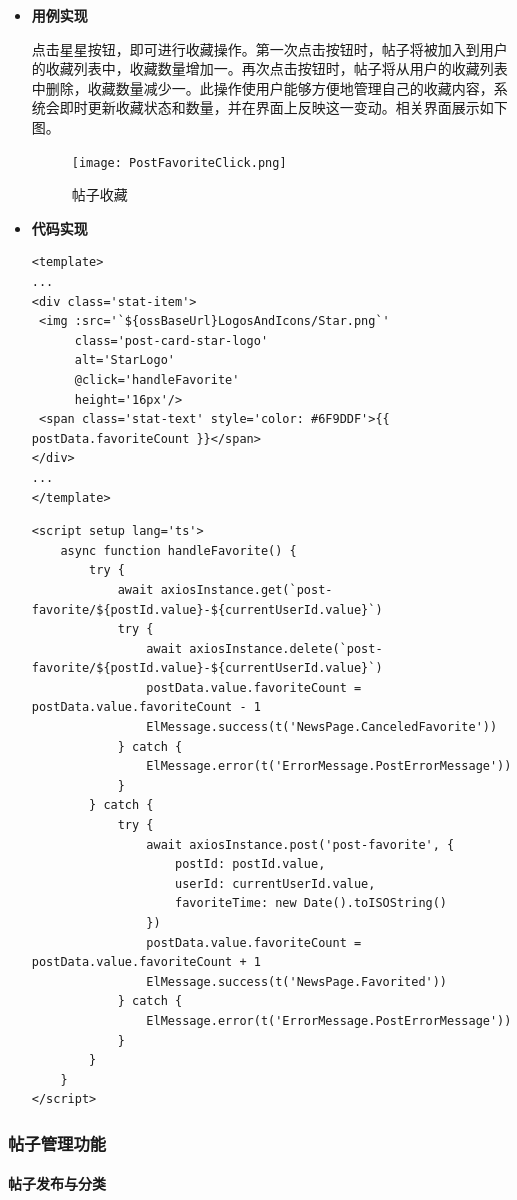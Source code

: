 \begin{itemize}
	\item \textbf{用例实现}
	
	点击星星按钮，即可进行收藏操作。第一次点击按钮时，帖子将被加入到用户的收藏列表中，收藏数量增加一。再次点击按钮时，帖子将从用户的收藏列表中删除，收藏数量减少一。此操作使用户能够方便地管理自己的收藏内容，系统会即时更新收藏状态和数量，并在界面上反映这一变动。相关界面展示如下图。
	
	\begin{figure}[H]
		\centering
		\texttt{[image: PostFavoriteClick.png]} 
		\caption{帖子收藏}
		\label{fig:post-favorite-click}
	\end{figure}
	
	\item \textbf{代码实现}
	\begin{verbatim}
<template>
...
<div class='stat-item'>
 <img :src='`${ossBaseUrl}LogosAndIcons/Star.png`'
      class='post-card-star-logo'
      alt='StarLogo'
      @click='handleFavorite'
      height='16px'/>
 <span class='stat-text' style='color: #6F9DDF'>{{ postData.favoriteCount }}</span>
</div>
...
</template>
	\end{verbatim}
	
	\begin{verbatim}
<script setup lang='ts'>
	async function handleFavorite() {
		try {
			await axiosInstance.get(`post-favorite/${postId.value}-${currentUserId.value}`)
			try {
				await axiosInstance.delete(`post-favorite/${postId.value}-${currentUserId.value}`)
				postData.value.favoriteCount = postData.value.favoriteCount - 1
				ElMessage.success(t('NewsPage.CanceledFavorite'))
			} catch {
				ElMessage.error(t('ErrorMessage.PostErrorMessage'))
			}
		} catch {
			try {
				await axiosInstance.post('post-favorite', {
					postId: postId.value,
					userId: currentUserId.value,
					favoriteTime: new Date().toISOString()
				})
				postData.value.favoriteCount = postData.value.favoriteCount + 1
				ElMessage.success(t('NewsPage.Favorited'))
			} catch {
				ElMessage.error(t('ErrorMessage.PostErrorMessage'))
			}
		}
	}
</script>
	\end{verbatim}
\end{itemize}

\subsubsection{帖子管理功能}

\paragraph{帖子发布与分类}

